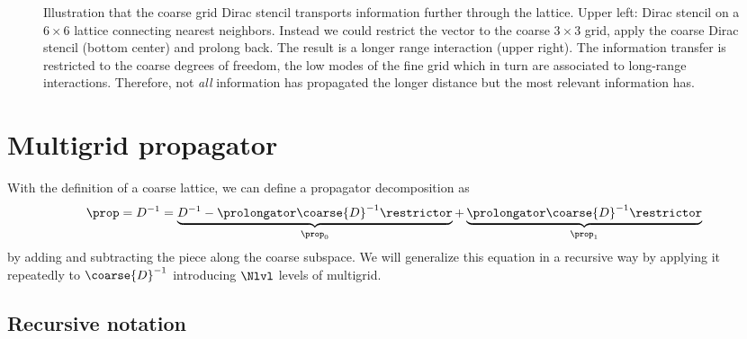 \begin{figure}
\centering

\caption{Illustration that the coarse grid Dirac stencil transports information further through the lattice. Upper left: Dirac stencil on a $6 \times 6$ lattice connecting nearest neighbors. Instead we could restrict the vector to the coarse $3 \times 3$ grid, apply the coarse Dirac stencil (bottom center) and prolong back. The result is a longer range interaction (upper right). The information transfer is restricted to the coarse degrees of freedom, \ie the low modes of the fine grid which in turn are associated to long-range interactions. Therefore, not \emph{all} information has propagated the longer distance but the most relevant information has.}
\label{fig:coarse:stencil}
\end{figure}

\section{Multigrid propagator}
\label{sec:mg:prop}

With the definition of a coarse lattice, we can define a propagator decomposition as
\begin{equation} \label{eq:mg:prop:decomp:2lvl}
\prop = D^{-1}
= \underbrace{
  D^{-1}
  - \prolongator \coarse{D}^{-1} \restrictor
}_{\prop_0}
+ \underbrace{
  \prolongator \coarse{D}^{-1} \restrictor
}_{\prop_1}
\end{equation}
by adding and subtracting the piece along the coarse subspace.
We will generalize this equation in a recursive way by applying it repeatedly to $\coarse{D}^{-1}$ introducing $\Nlvl$ levels of multigrid.

\subsection{Recursive notation}

